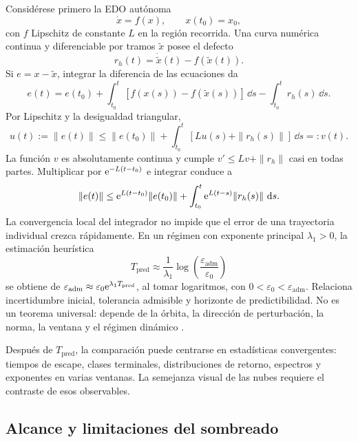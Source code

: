 Considérese primero la EDO autónoma
\begin{equation}
 \dot x=f(x),\qquad x(t_0)=x_0,
 \label{eq:reliability-ode}
\end{equation}
con \(f\) Lipschitz de constante \(L\) en la región recorrida. Una curva
numérica continua y diferenciable por tramos \(\widetilde x\) posee el defecto
\begin{equation}
 r_h(t)=\dot{\widetilde x}(t)-f(\widetilde x(t)).
 \label{eq:reliability-defect}
\end{equation}
Si \(e=x-\widetilde x\), integrar la diferencia de las ecuaciones da
\[
 e(t)=e(t_0)+\int_{t_0}^t[f(x(s))-f(\widetilde x(s))]\,\dd s
                  -\int_{t_0}^tr_h(s)\,\dd s.
\]
Por Lipschitz y la desigualdad triangular,
\[
 u(t):=\|e(t)\|\leq\|e(t_0)\|
            +\int_{t_0}^t[Lu(s)+\|r_h(s)\|]\,\dd s=:v(t).
\]
La función \(v\) es absolutamente continua y cumple
\(v'\leq Lv+\|r_h\|\) casi en todas partes. Multiplicar por
\(\mathrm e^{-L(t-t_0)}\) e integrar conduce a
\begin{equation}
 \|e(t)\|
 \leq \mathrm e^{L(t-t_0)}\|e(t_0)\|
 +\int_{t_0}^{t}\mathrm e^{L(t-s)}\|r_h(s)\|\,\,\mathrm d s .
 \label{eq:reliability-gronwall}
\end{equation}
La convergencia local del integrador no impide que el error de una trayectoria
individual crezca rápidamente. En un régimen con exponente principal
\(\lambda_1>0\), la estimación heurística
\begin{equation}
 T_{\mathrm{pred}}
 \approx\frac{1}{\lambda_1}
 \log\!\left(\frac{\varepsilon_{\mathrm{adm}}}
                   {\varepsilon_0}\right)
 \label{eq:reliability-predictability-horizon}
\end{equation}
se obtiene de \(\varepsilon_{\mathrm{adm}}\approx
\varepsilon_0\mathrm e^{\lambda_1T_{\mathrm{pred}}}\), al tomar logaritmos, con
\(0<\varepsilon_0<\varepsilon_{\mathrm{adm}}\). Relaciona incertidumbre
inicial, tolerancia admisible y horizonte de predictibilidad. No es un teorema universal: depende de la órbita,
la dirección de perturbación, la norma, la ventana y el régimen dinámico
\cite{VallejoSanjuan2017Predictability}.

Después de \(T_{\mathrm{pred}}\), la comparación puede centrarse en
estadísticas convergentes: tiempos de escape, clases terminales,
distribuciones de retorno, espectros y exponentes en varias ventanas. La
semejanza visual de las nubes requiere el contraste de esos observables.

\subsection{Alcance y limitaciones del sombreado}

